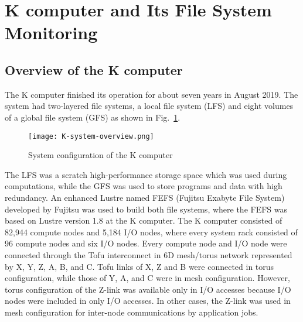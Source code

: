 \documentclass{jhps}
\begin{document}
\section{K computer and Its File System Monitoring}\label{sec:K_OVERVIEW}
\label{sec:K_COMP}

\subsection{Overview of the K computer}

The K computer finished its operation for about seven years in August 2019.
The system had two-layered file systems, a local file system (LFS)
and eight volumes of a global file system (GFS) as shown in Fig.~\ref{fig:K_OVERVIEW}.
%
\begin{figure}[tb]
\centering
\texttt{[image: K-system-overview.png]}
\caption{System configuration of the K computer}
\label{fig:K_OVERVIEW}
\end{figure}
%
The LFS was a scratch high-performance storage space which was used during computations,
while the GFS was used to store programs and data with high redundancy.
An enhanced Lustre named FEFS (Fujitsu Exabyte File System)~\cite{fefs:fujitsu-tech-si}
developed by Fujitsu was used to build both file systems,
where the FEFS was based on Lustre version 1.8 at the K computer.
The K computer consisted of 82,944 compute nodes and 5,184 I/O nodes,
where every system rack consisted of 96 compute nodes and six I/O nodes.
Every compute node and I/O node were connected through the Tofu interconnect
in 6D mesh/torus network represented by X, Y, Z, A, B, and C.
Tofu links of X, Z and B were connected in torus configuration,
while those of Y, A, and C were in mesh configuration.
However, torus configuration of the Z-link was available only in I/O accesses
because I/O nodes were included in only I/O accesses.
In other cases, the Z-link was used in mesh configuration for inter-node communications
by application jobs.
\end{document}
